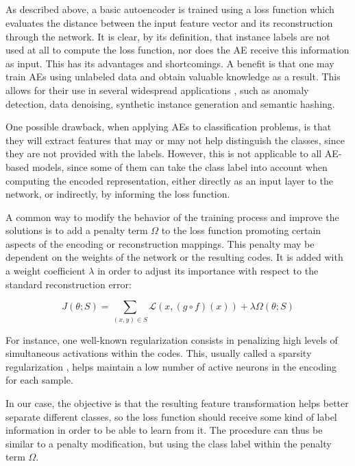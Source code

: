 \subsection{}

As described above, a basic autoencoder is trained using a loss function which evaluates the distance between the input feature vector and its reconstruction through the network. It is clear, by its definition, that instance labels are not used at all to compute the loss function, nor does the AE receive this information as input. This has its advantages and shortcomings. A benefit is that one may train AEs using unlabeled data and obtain valuable knowledge as a result. This allows for their use in several widespread applications , such as anomaly detection, data denoising, synthetic instance generation and semantic hashing.

One possible drawback, when applying AEs to classification problems, is that they will extract features that may or may not help distinguish the classes, since they are not provided with the labels. However, this is not applicable to all AE-based models, since some of them can take the class label into account when computing the encoded representation, either directly as an input layer to the network, or indirectly, by informing the loss function.

A common way to modify the behavior of the training process and improve the solutions is to add a penalty term $\Omega$ to the loss function promoting certain aspects of the encoding or reconstruction mappings. This penalty may be dependent on the weights of the network or the resulting codes. It is added with a weight coefficient $\lambda$ in order to adjust its importance with respect to the standard reconstruction error:

\begin{equation}J\left(\theta;S\right)=\sum_{(x,y)\in S}\mathcal L\left(x,\left(g\circ f\right)\left(x\right)\right) + \lambda\Omega\left(\theta;S\right)\end{equation}

For instance, one well-known regularization consists in penalizing high levels of simultaneous activations within the codes. This, usually called a sparsity regularization , helps maintain a low number of active neurons in the encoding for each sample.

In our case, the objective is that the resulting feature transformation helps better separate different classes, so the loss function should receive some kind of label information in order to be able to learn from it. The procedure can thus be similar to a penalty modification, but using the class label within the penalty term $\Omega$.

